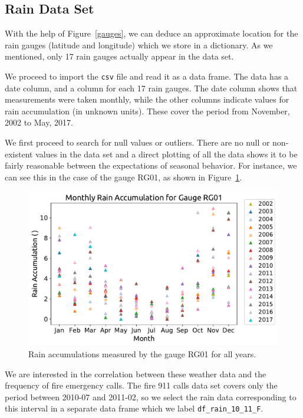 \documentclass[12pt,a4paper]{article}
\begin{document}
\subsection{Rain Data Set}

With the help of Figure~\ref{gauges}, we can deduce an approximate location for the rain gauges (latitude and longitude) which we store in a dictionary. As we mentioned, only 17 rain gauges actually appear in the data set.

We proceed to import the \verb|csv| file and read it as a data frame. The data has a date column, and a column for each 17 rain gauges. The date column shows that measurements were taken monthly, while the other columns indicate values for rain accumulation (in unknown units). These cover the period from November, 2002 to May, 2017.

We first proceed to search for null values or outliers. There are no null or non-existent values in the data set and a direct plotting of all the data shows it to be fairly reasonable between the expectations of seasonal behavior. For instance, we can see this in the case of the gauge RG01, as shown in Figure~\ref{RG01_Full}.

\begin{figure}[ht!]
\centering
\includegraphics[scale=0.6]{figs/RG01_Full.pdf}
\caption{Rain accumulations measured by the gauge RG01 for all years.}
\label{RG01_Full}
\end{figure}

We are interested in the correlation between these weather data and the frequency of fire emergency calls. The fire 911 calls data set covers only the period between 2010-07 and 2011-02, so we select the rain data corresponding to this interval in a separate data frame which we label \verb|df_rain_10_11_F|.
\end{document}
